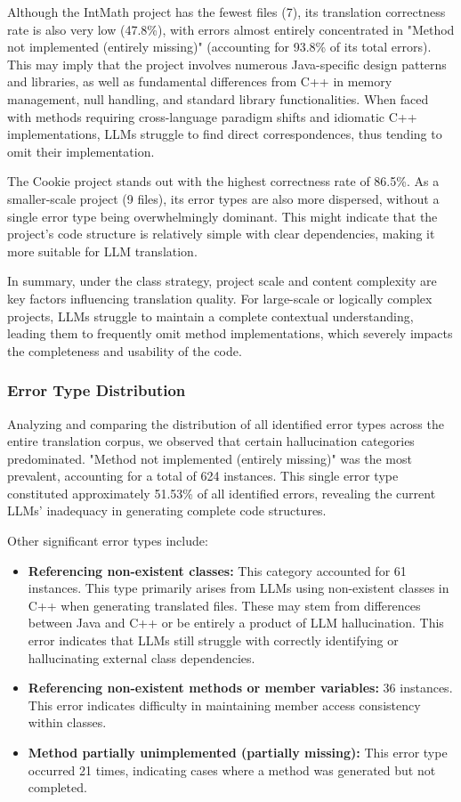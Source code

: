 Although the IntMath project has the fewest files (7), its translation correctness rate is also very low (47.8\%), with errors almost entirely concentrated in "Method not implemented (entirely missing)" (accounting for 93.8\% of its total errors). This may imply that the project involves numerous Java-specific design patterns and libraries, as well as fundamental differences from C++ in memory management, null handling, and standard library functionalities. When faced with methods requiring cross-language paradigm shifts and idiomatic C++ implementations, LLMs struggle to find direct correspondences, thus tending to omit their implementation.

The Cookie project stands out with the highest correctness rate of 86.5\%. As a smaller-scale project (9 files), its error types are also more dispersed, without a single error type being overwhelmingly dominant. This might indicate that the project's code structure is relatively simple with clear dependencies, making it more suitable for LLM translation.

In summary, under the class strategy, project scale and content complexity are key factors influencing translation quality. For large-scale or logically complex projects, LLMs struggle to maintain a complete contextual understanding, leading them to frequently omit method implementations, which severely impacts the completeness and usability of the code.


\subsubsection{Error Type Distribution}
Analyzing and comparing the distribution of all identified error types across the entire translation corpus, we observed that certain hallucination categories predominated. "Method not implemented (entirely missing)" was the most prevalent, accounting for a total of 624 instances. This single error type constituted approximately 51.53\% of all identified errors, revealing the current LLMs' inadequacy in generating complete code structures.

Other significant error types include:
\begin{itemize}[leftmargin=1.5em]
    \item \textbf{Referencing non-existent classes: }This category accounted for 61 instances. This type primarily arises from LLMs using non-existent classes in C++ when generating translated files. These may stem from differences between Java and C++ or be entirely a product of LLM hallucination. This error indicates that LLMs still struggle with correctly identifying or hallucinating external class dependencies.
    \item \textbf{Referencing non-existent methods or member variables: }36 instances. This error indicates difficulty in maintaining member access consistency within classes.
    \item \textbf{Method partially unimplemented (partially missing): }This error type occurred 21 times, indicating cases where a method was generated but not completed.
\end{itemize}

